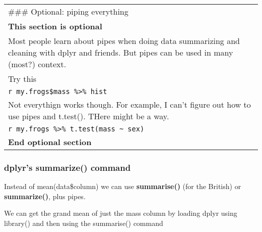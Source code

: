\documentclass[]{book}
\theoremstyle{definition}
\theoremstyle{definition}
\theoremstyle{definition}
\theoremstyle{remark}
\begin{document}
\begin{longtable}[]{@{}l@{}}
\toprule
\begin{minipage}[t]{0.16\columnwidth}\raggedright\strut
\#\#\# Optional: piping everything\strut
\end{minipage}\tabularnewline
\begin{minipage}[t]{0.16\columnwidth}\raggedright\strut
\textbf{This section is optional}\strut
\end{minipage}\tabularnewline
\begin{minipage}[t]{0.16\columnwidth}\raggedright\strut
Most people learn about pipes when doing data summarizing and cleaning
with dplyr and friends. But pipes can be used in many (most?)
context.\strut
\end{minipage}\tabularnewline
\begin{minipage}[t]{0.16\columnwidth}\raggedright\strut
Try this\strut
\end{minipage}\tabularnewline
\begin{minipage}[t]{0.16\columnwidth}\raggedright\strut
\texttt{r\ my.frogs\$mass\ \%\textgreater{}\%\ hist}\strut
\end{minipage}\tabularnewline
\begin{minipage}[t]{0.16\columnwidth}\raggedright\strut
Not everythign works though. For example, I can't figure out how to use
pipes and t.test(). THere might be a way.\strut
\end{minipage}\tabularnewline
\begin{minipage}[t]{0.16\columnwidth}\raggedright\strut
\texttt{r\ my.frogs\ \%\textgreater{}\%\ t.test(mass\ \textasciitilde{}\ sex)}\strut
\end{minipage}\tabularnewline
\begin{minipage}[t]{0.16\columnwidth}\raggedright\strut
\textbf{End optional section}\strut
\end{minipage}\tabularnewline
\bottomrule
\end{longtable}

\subsubsection{dplyr's summarize()
command}\label{dplyrs-summarize-command}

Instead of mean(data\$column) we can use \textbf{summarise()} (for the
British) or \textbf{summarize()}, plus pipes.

We can get the grand mean of just the mass column by loading dplyr using
library() and then using the summarise() command
\end{document}
